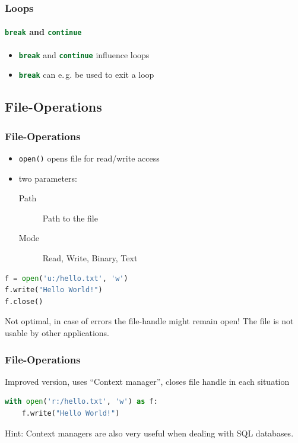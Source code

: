 \documentclass[ngerman]{beamer}
\newcommand{\ta}[1]{\textattachfile[color=1 0 0]{#1}{Code}}
\begin{document}
\begin{frame}[containsverbatim]
\frametitle{Loops}
\framesubtitle{\lstinline[language={Python}]{break} and \lstinline[language={Python}]{continue}}

\begin{itemize}
\item \lstinline[language={Python}]{break} and \lstinline[language={Python}]{continue} influence loops
\item \lstinline[language={Python}]{break} can e.\,g. be used to exit a loop 
\end{itemize}



\end{frame}


\subsection{File-Operations}

\begin{frame}[containsverbatim]
\frametitle{File-Operations}

\begin{itemize}
\item \texttt{open()} opens file for read/write access
\item two parameters:

\begin{description}
\item[Path] Path to the file
\item[Mode] Read, Write, Binary, Text
\end{description}
\end{itemize}

\begin{lstlisting}[language=Python,caption={Simple example for \texttt{write()}}]
f = open('u:/hello.txt', 'w')
f.write("Hello World!")
f.close()
\end{lstlisting}

Not optimal, in case of errors the file-handle might remain open! The file is not usable by other applications.
\end{frame}


\begin{frame}[containsverbatim]
\frametitle{File-Operations}

Improved version, uses \enquote{Context manager}, closes file handle in each situation

\begin{lstlisting}[language=Python,caption={Improved example for \texttt{write()}}]
with open('r:/hello.txt', 'w') as f:
    f.write("Hello World!")
\end{lstlisting}

Hint: Context managers are also very useful when dealing with SQL databases.

\end{frame}
\end{document}
